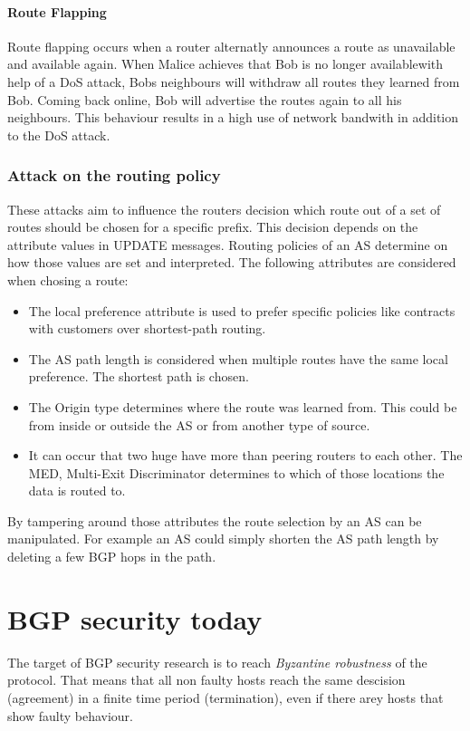 \documentclass[12pt]{IEEEtran}
\begin{document}
		\paragraph{Route Flapping}
		Route flapping occurs when a router alternatly announces a route as unavailable and available again. When Malice achieves that Bob is no longer availablewith help of a DoS attack, Bobs neighbours will withdraw all routes they learned from Bob. Coming back online, Bob will advertise the routes again to all his neighbours.
		This behaviour results in a high use of network bandwith in addition to the DoS attack. 

		\subsubsection{Attack on the routing policy} 
		
		These attacks aim to influence the routers decision which route out of a set of routes should be chosen for a specific prefix. This decision depends on the attribute values in UPDATE messages. Routing policies of an AS determine on how those values are set and interpreted. The following attributes are considered when chosing a route:
		\begin{itemize}
			\item The local preference attribute is used to prefer specific policies like contracts with customers over shortest-path routing.
			\item The AS path length is considered when multiple routes have the same local preference. The shortest path is chosen.
			\item The Origin type determines where the route was learned from. This could be from inside or outside the AS or from another type of source.
			\item It can occur that two huge have more than peering routers to each other. The MED, Multi-Exit Discriminator determines to which of those locations the data is routed to. 
		\end{itemize}
		By tampering around those attributes the route selection by an AS can be manipulated. 
		For example an AS could simply shorten the AS path length by deleting a few BGP hops in the path.

       \section{BGP security today}
		The target of BGP security research is to reach \emph{Byzantine robustness} of the protocol. That means that all non faulty hosts reach the same descision (agreement) in a finite time period (termination), even if there arey hosts that show faulty behaviour. %
		
\end{document}

